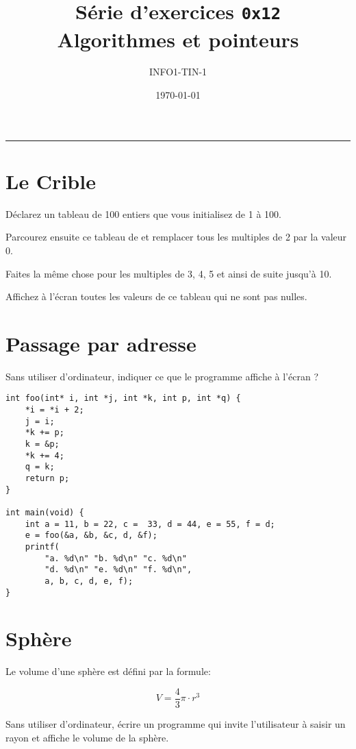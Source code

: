 



\date{\today}
\author{INFO1-TIN-1}
\title{Série d'exercices \texttt{0x12} \\ \textbf{Algorithmes et pointeurs}}
\maketitle

\noindent\rule{\textwidth}{.3pt}


\section{Le Crible}

Déclarez un tableau de 100 entiers que vous initialisez de 1 à 100.

Parcourez ensuite ce tableau de et remplacer tous les multiples de 2 par la valeur 0.

Faites la même chose pour les multiples de 3, 4, 5 et ainsi de suite jusqu'à 10.

Affichez à l'écran toutes les valeurs de ce tableau qui ne sont pas nulles.

\section{Passage par adresse}

Sans utiliser d'ordinateur, indiquer ce que le programme affiche à l'écran ?

\begin{lstlisting}
int foo(int* i, int *j, int *k, int p, int *q) {
    *i = *i + 2;
    j = i;
    *k += p;
    k = &p;
    *k += 4;
    q = k;
    return p;
}

int main(void) {
    int a = 11, b = 22, c =  33, d = 44, e = 55, f = d;
    e = foo(&a, &b, &c, d, &f);
    printf(
        "a. %d\n" "b. %d\n" "c. %d\n"
        "d. %d\n" "e. %d\n" "f. %d\n",
        a, b, c, d, e, f);
}
\end{lstlisting}

\section{Sphère}

Le volume d'une sphère est défini par la formule:

\[V = \frac{4}{3}\pi\cdot r^3\]

Sans utiliser d'ordinateur, écrire un programme qui invite l'utilisateur à saisir un rayon et affiche le volume de la sphère.




